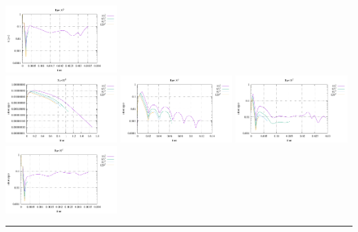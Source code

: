 \begin{center}
\includegraphics[width=4.297cm]{python_codes/fieldstone_155/results/conv_psi_Ra1e6}\\
\includegraphics[width=4.297cm]{python_codes/fieldstone_155/results/conv_omega_Ra1e3}
\includegraphics[width=4.297cm]{python_codes/fieldstone_155/results/conv_omega_Ra1e4}
\includegraphics[width=4.297cm]{python_codes/fieldstone_155/results/conv_omega_Ra1e5}
\includegraphics[width=4.297cm]{python_codes/fieldstone_155/results/conv_omega_Ra1e6}\\
\end{center}

\par\noindent\rule{\textwidth}{0.4pt}

\vspace{.5cm}

\begin{center}
\end{center}


